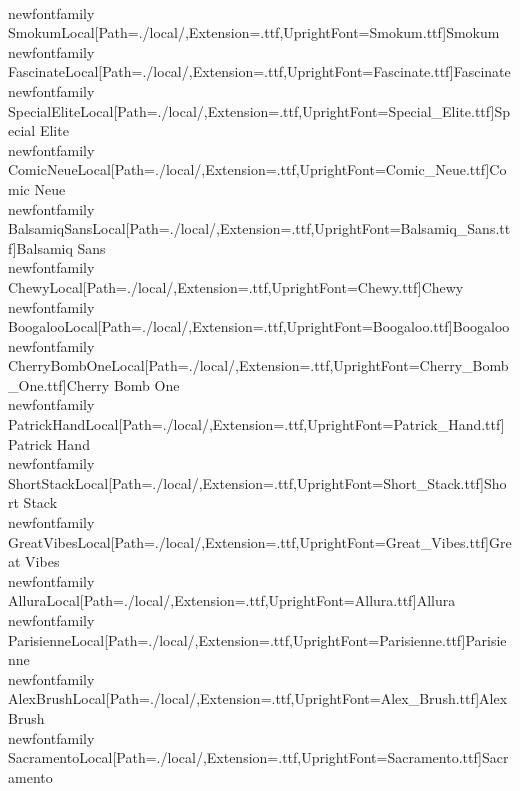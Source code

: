 \\newfontfamily\\SmokumLocal[Path=./local/,Extension=.ttf,UprightFont={Smokum.ttf}]{Smokum}
\\newfontfamily\\FascinateLocal[Path=./local/,Extension=.ttf,UprightFont={Fascinate.ttf}]{Fascinate}
\\newfontfamily\\SpecialEliteLocal[Path=./local/,Extension=.ttf,UprightFont={Special_Elite.ttf}]{Special Elite}
\\newfontfamily\\ComicNeueLocal[Path=./local/,Extension=.ttf,UprightFont={Comic_Neue.ttf}]{Comic Neue}
\\newfontfamily\\BalsamiqSansLocal[Path=./local/,Extension=.ttf,UprightFont={Balsamiq_Sans.ttf}]{Balsamiq Sans}
\\newfontfamily\\ChewyLocal[Path=./local/,Extension=.ttf,UprightFont={Chewy.ttf}]{Chewy}
\\newfontfamily\\BoogalooLocal[Path=./local/,Extension=.ttf,UprightFont={Boogaloo.ttf}]{Boogaloo}
\\newfontfamily\\CherryBombOneLocal[Path=./local/,Extension=.ttf,UprightFont={Cherry_Bomb_One.ttf}]{Cherry Bomb One}
\\newfontfamily\\PatrickHandLocal[Path=./local/,Extension=.ttf,UprightFont={Patrick_Hand.ttf}]{Patrick Hand}
\\newfontfamily\\ShortStackLocal[Path=./local/,Extension=.ttf,UprightFont={Short_Stack.ttf}]{Short Stack}
\\newfontfamily\\GreatVibesLocal[Path=./local/,Extension=.ttf,UprightFont={Great_Vibes.ttf}]{Great Vibes}
\\newfontfamily\\AlluraLocal[Path=./local/,Extension=.ttf,UprightFont={Allura.ttf}]{Allura}
\\newfontfamily\\ParisienneLocal[Path=./local/,Extension=.ttf,UprightFont={Parisienne.ttf}]{Parisienne}
\\newfontfamily\\AlexBrushLocal[Path=./local/,Extension=.ttf,UprightFont={Alex_Brush.ttf}]{Alex Brush}
\\newfontfamily\\SacramentoLocal[Path=./local/,Extension=.ttf,UprightFont={Sacramento.ttf}]{Sacramento}

